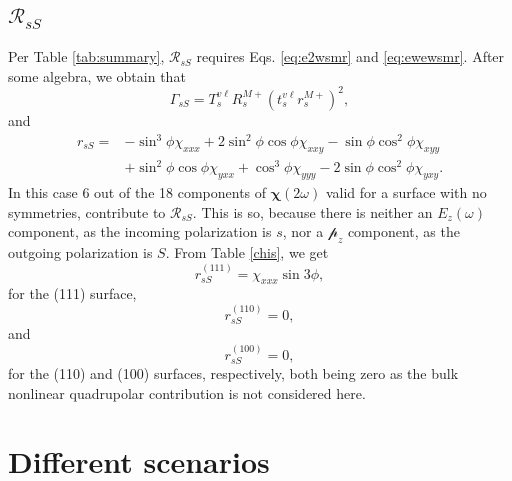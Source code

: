 \subsection{\texorpdfstring{$\mathcal{R}_{sS}$}{RsS}}\label{sec:RsS}

Per Table \ref{tab:summary}, $\mathcal{R}_{sS}$ requires Eqs. \eqref{eq:e2wsmr}
and \eqref{eq:ewewsmr}. After some algebra, we obtain that
\begin{equation}
\Gamma_{sS} = 
T_{s}^{v\ell}R^{M+}_{s}\left(t^{v\ell}_{s}r^{M+}_{s}\right)^{2},
\end{equation}
and
\begin{equation}
\begin{split}
r_{sS} = 
&- \sin^{3}\phi\chi_{xxx}
 + 2\sin^{2}\phi\cos\phi\chi_{xxy}
 - \sin\phi\cos^{2}\phi\chi_{xyy}\\
&+ \sin^{2}\phi\cos\phi\chi_{yxx}
 + \cos^{3}\phi\chi_{yyy}
 - 2\sin\phi\cos^{2}\phi\chi_{yxy}
.
\end{split}
\end{equation}
In this case 6 out of the 18 components of $\boldsymbol{\chi}(2\omega)$ valid
for a surface with no symmetries, contribute to $\mathcal{R}_{sS}$. This is so,
because there is neither an $E_{z}(\omega)$ component, as the incoming
polarization is $s$, nor a $\mathcal{p}_{z}$ component, as the outgoing
polarization is $S$. From Table \ref{chis}, we get
\begin{equation}
r^{(111)}_{sS} = \chi_{xxx}\sin3\phi,
\end{equation}
for the (111) surface,
\begin{equation}
r^{(110)}_{sS} = 0,
\end{equation}
and
\begin{equation}
r^{(100)}_{sS} = 0,
\end{equation}
for the (110) and (100) surfaces, respectively, both being zero as the bulk
nonlinear quadrupolar contribution is not considered here.



\section{Different scenarios}\label{sec:scenarios}

